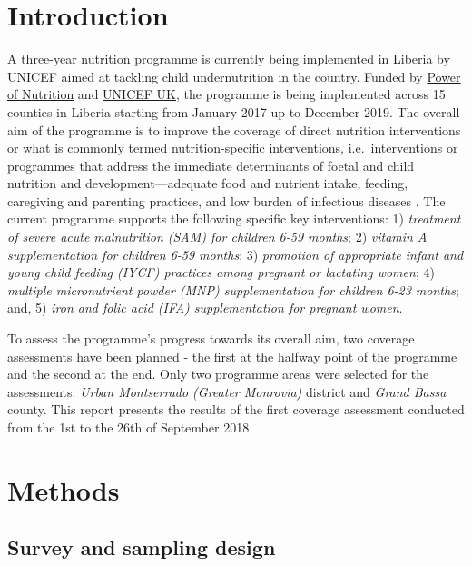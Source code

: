\documentclass[12pt,a4paper]{article}
\begin{document}
\newpage

\hypertarget{introduction}{%
\section{Introduction}\label{introduction}}

A three-year nutrition programme is currently being implemented in Liberia by UNICEF aimed at tackling child undernutrition in the country. Funded by \href{http://www.powerofnutrition.org}{Power of Nutrition} and \href{https://www.unicef.org.uk}{UNICEF UK}, the programme is being implemented across 15 counties in Liberia starting from January 2017 up to December 2019. The overall aim of the programme is to improve the coverage of direct nutrition interventions or what is commonly termed nutrition-specific interventions, i.e.~interventions or programmes that address the immediate determinants of foetal and child nutrition and development---adequate food and nutrient intake, feeding, caregiving and parenting practices, and low burden of infectious diseases \citep[\citet{Ruel:2013kr}]{Bhutta:2013ks}. The current programme supports the following specific key interventions: 1) \emph{treatment of severe acute malnutrition (SAM) for children 6-59 months}; 2) \emph{vitamin A supplementation for children 6-59 months}; 3) \emph{promotion of appropriate infant and young child feeding (IYCF) practices among pregnant or lactating women}; 4) \emph{multiple micronutrient powder (MNP) supplementation for children 6-23 months}; and, 5) \emph{iron and folic acid (IFA) supplementation for pregnant women}.

To assess the programme's progress towards its overall aim, two coverage assessments have been planned - the first at the halfway point of the programme and the second at the end. Only two programme areas were selected for the assessments: \emph{Urban Montserrado (Greater Monrovia)} district and \emph{Grand Bassa} county. This report presents the results of the first coverage assessment conducted from the 1st to the 26th of September 2018

\hypertarget{methods}{%
\section{Methods}\label{methods}}

\hypertarget{survey-and-sampling-design}{%
\subsection{Survey and sampling design}\label{survey-and-sampling-design}}
\end{document}
